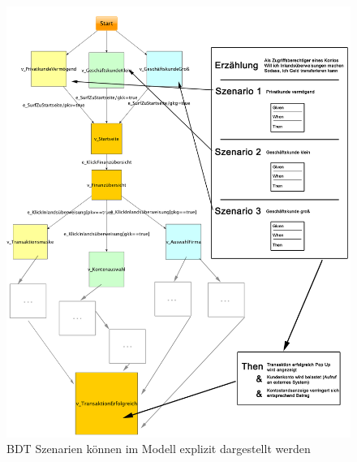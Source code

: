 \begin{figure}
\hspace*{-2cm}
  \centering
     \includegraphics[width=1.25\textwidth]{figures/mbt_bdt_gesamt.png}
  \caption{BDT Szenarien können im Modell explizit dargestellt werden}
  \label{fig:mbt_bdt_gesamt}
\end{figure}


